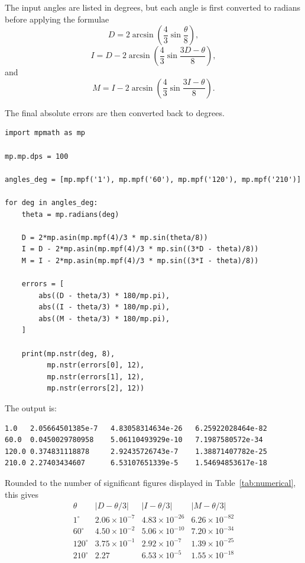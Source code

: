 \documentclass[11pt]{article}
\theoremstyle{remark}
\begin{document}
The input angles are listed in degrees, but each angle is first converted to
radians before applying the formulae
\[
D
=
2\arcsin\!\left(
\frac43\sin\frac{\theta}{8}
\right),
\]
\[
I
=
D
-
2\arcsin\!\left(
\frac43\sin\frac{3D-\theta}{8}
\right),
\]
and
\[
M
=
I
-
2\arcsin\!\left(
\frac43\sin\frac{3I-\theta}{8}
\right).
\]

\newpage
The final absolute errors are then converted back to degrees.

\begin{verbatim}
import mpmath as mp

mp.mp.dps = 100

angles_deg = [mp.mpf('1'), mp.mpf('60'), mp.mpf('120'), mp.mpf('210')]

for deg in angles_deg:
    theta = mp.radians(deg)

    D = 2*mp.asin(mp.mpf(4)/3 * mp.sin(theta/8))
    I = D - 2*mp.asin(mp.mpf(4)/3 * mp.sin((3*D - theta)/8))
    M = I - 2*mp.asin(mp.mpf(4)/3 * mp.sin((3*I - theta)/8))

    errors = [
        abs((D - theta/3) * 180/mp.pi),
        abs((I - theta/3) * 180/mp.pi),
        abs((M - theta/3) * 180/mp.pi),
    ]

    print(mp.nstr(deg, 8),
          mp.nstr(errors[0], 12),
          mp.nstr(errors[1], 12),
          mp.nstr(errors[2], 12))
\end{verbatim}

The output is:

\begin{verbatim}
1.0   2.05664501385e-7   4.83058314634e-26   6.25922028464e-82
60.0  0.0450029780958    5.06110493929e-10   7.1987580572e-34
120.0 0.374831118878     2.92435726743e-7    1.38871407782e-25
210.0 2.27403434607      6.53107651339e-5    1.54694853617e-18
\end{verbatim}

Rounded to the number of significant figures displayed in
Table~\ref{tab:numerical}, this gives
\[
\begin{array}{c|ccc}
\theta & |D-\theta/3| & |I-\theta/3| & |M-\theta/3| \\
\hline
1^\circ   & 2.06\times 10^{-7} & 4.83\times 10^{-26} & 6.26\times 10^{-82} \\
60^\circ  & 4.50\times 10^{-2} & 5.06\times 10^{-10} & 7.20\times 10^{-34} \\
120^\circ & 3.75\times 10^{-1} & 2.92\times 10^{-7}  & 1.39\times 10^{-25} \\
210^\circ & 2.27                & 6.53\times 10^{-5}  & 1.55\times 10^{-18}
\end{array}
\]
\end{document}
